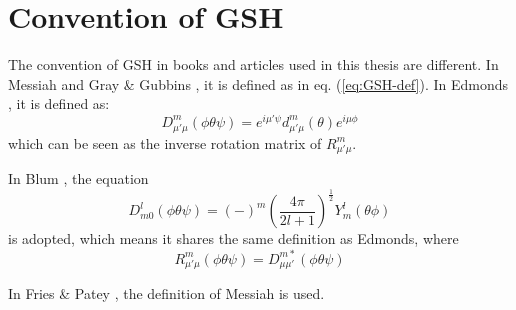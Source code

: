 \section{Convention of GSH\label{sec:Convention-of-GSH}}

The convention of \acs{GSH} in books and articles used in this thesis
are different. In Messiah \citep{Messiah} and Gray \& Gubbins \citep{Gray-Gubbins},
it is defined as in eq. (\ref{eq:GSH-def}). In Edmonds \citep{Edmonds},
it is defined as:
\begin{equation}
D_{\mu'\mu}^{m}(\phi\theta\psi)=e^{i\mu'\psi}d_{\mu'\mu}^{m}(\theta)e^{i\mu\phi}\label{eq:GSH-def-1}
\end{equation}
which can be seen as the inverse rotation matrix of $R_{\mu'\mu}^{m}$.

In Blum \citep{Blum_I,Blum_II}, the equation 
\begin{equation}
D_{m0}^{l}(\phi\theta\psi)=\left(-\right)^{m}\left(\dfrac{4\pi}{2l+1}\right)^{\frac{1}{2}}Y_{m}^{l}(\theta\phi)
\end{equation}
is adopted, which means it shares the same definition as Edmonds, where
\begin{equation}
R_{\mu'\mu}^{m}(\phi\theta\psi)=D_{\mu\mu'}^{m*}(\phi\theta\psi)\label{eq:GSH-def-2}
\end{equation}

In Fries \& Patey \citep{Fries_Patey_1985}, the definition of Messiah
is used.
